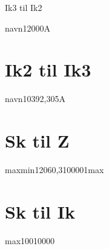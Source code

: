 \documentclass[11pt]{report}
\def\myspace{\hspace{5pt}}
\begin{document}

\newenvironment{HV@I'K,FN=>IK,FN,sek@trafo}[4]%
{
\StrSubstitute{#2}{,}{.}[\IK]%
\StrSubstitute{#3}{,}{.}[\U]%
\StrSubstitute{#4}{,}{.}[\UU]%

\FProot\RodAfTre{3}{2}%

\FPeval\res{clip(round(\IK * \RodAfTre * (\U / \UU) / 1000:2))}%

\begin{equation}
    \begin{split}
        I_{k1,LV} &= I^{\prime}_{k1} \cdot \sqrt{3} \cdot \frac{U_{1,#1}}{U_{2,#1}} \myspace [\si{A}]\\
        &= \num{\IK} \cdot \sqrt{3} \cdot \frac{\num{\U}}{\num{\UU}}\\
        &= \SI{\res}{\kilo\ampere}
    \end{split}
\end{equation}

\begin{equation*}
    I_{k1,LV} \approx I_{k3,LV}
\end{equation*}
}








\section{Ik3 til Ik2}
\begin{IK,3F=>IK,2F}{navn}{12000}{A}
\end{IK,3F=>IK,2F}

\section{Ik2 til Ik3}
\begin{IK,2F=>IK,3F}{navn}{10392,305}{A}
\end{IK,2F=>IK,3F}

\section{Sk til Z}
\begin{HV@Sk=>Z}{max}{min}{120}{6}{0,3}{10000}{1}{max}%
\end{HV@Sk=>Z}

\section{Sk til Ik}
\begin{HV@Sk=>Ik}{max}{100}{10000}%
\end{HV@Sk=>Ik}
\end{document}
